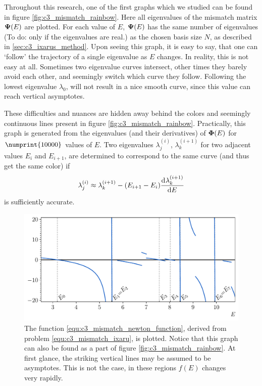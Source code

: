 Throughout this research, one of the first graphs which we studied can be found in figure \ref{fig:c3_mismatch_rainbow}. Here all eigenvalues of the mismatch matrix $\vb{\Psi}(E)$ are plotted. For each value of $E$, $\vb{\Psi}(E)$ has the same number of eigenvalues ({\color{red}To do: only if the eigenvalues are real.}) as the chosen basis size $N$, as described in \ref{sec:c3_ixarus_method}. Upon seeing this graph, it is easy to say, that one can `follow' the trajectory of a single eigenvalue as $E$ changes. In reality, this is not easy at all. Sometimes two eigenvalue curves intersect, other times they barely avoid each other, and seemingly switch which curve they follow. Following the lowest eigenvalue $\lambda_0$, will  not result in a nice smooth curve, since this value can reach vertical asymptotes.

These difficulties and nuances are hidden away behind the colors and seemingly continuous lines present in figure \ref{fig:c3_mismatch_rainbow}. Practically, this graph is generated from the eigenvalues (and their derivatives) of $\vb{\Phi}(E)$ for $\numprint{10000}$ values of $E$. Two eigenvalues $\lambda^{(i)}_j$, $\lambda^{(i+1)}_k$  for two adjacent values $E_{i}$ and $E_{i+1}$, are determined to correspond to the same curve (and thus get the same color) if
$$ \lambda^{(i)}_j \approx \lambda^{(i+1)}_k - (E_{i+1} - E_i) \dv[]{\lambda^{(i+1)}_k}{E} $$
is sufficiently accurate.

\begin{figure}
    \centering
    \includegraphics[width=\textwidth]{img/chapter3/mismatch_newton.pdf}
    \caption{\label{fig:c3_mismatch_newton} The function \eqref{equ:c3_mismatch_newton_function}, derived from problem \eqref{equ:c3_mismatch_ixaru}, is plotted. Notice that this graph can also be found as a part of figure \ref{fig:c3_mismatch_rainbow}. At first glance, the striking vertical lines may be assumed to be asymptotes. This is not the case, in these regions $f(E)$ changes very rapidly.}
\end{figure}

